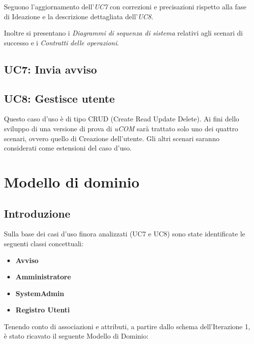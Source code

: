 \documentclass[12pt]{report}
\begin{document}
	Seguono l'aggiornamento dell'\textit{UC7} con correzioni e precisazioni rispetto alla fase di Ideazione e la descrizione dettagliata dell'\textit{UC8}.
	
	Inoltre si presentano i \textit{Diagrammi di sequenza di sistema} relativi agli scenari di successo e i \textit{Contratti delle operazioni}.
	
	\subsection{UC7: Invia avviso}

		

	\subsection{UC8: Gestisce utente}

	Questo caso d'uso è di tipo CRUD (Create Read Update Delete). Ai fini dello sviluppo di una versione di prova di \textit{uCOM} sarà trattato solo uno dei quattro scenari, ovvero quello di Creazione dell'utente. Gli altri scenari saranno considerati come estensioni del caso d'uso.

		
	
	
	\newpage
	
	
	\section{Modello di dominio}
	
	\subsection{Introduzione}
	
	Sulla base dei casi d'uso finora analizzati (UC7 e UC8) sono state identificate le seguenti classi concettuali:
	\begin{itemize}
		\item \textbf{Avviso}
		\item \textbf{Amministratore}		
		\item \textbf{SystemAdmin}
		\item \textbf{Registro Utenti}
	\end{itemize}

	Tenendo conto di associazioni e attributi, a partire dallo schema dell'Iterazione 1, è stato ricavato il seguente Modello di Dominio:
	
\end{document}
